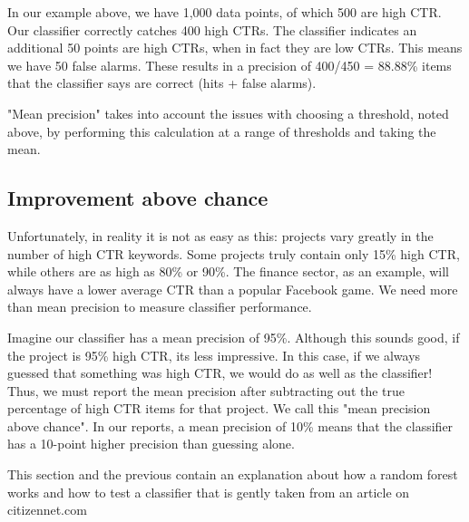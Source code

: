 
In our example above, we have 1,000 data points, of which 500 are high CTR. Our classifier correctly catches 400 high CTRs. The classifier indicates an additional 50 points are high CTRs, when in fact they are low CTRs. This means we have 50 false alarms. These results in a precision of 400/450 = 88.88\% items that the classifier says are correct (hits + false alarms).


"Mean precision" takes into account the issues with choosing a threshold, noted above, by performing this calculation at a range of thresholds and taking the mean.

\subsection*{Improvement above chance}
Unfortunately, in reality it is not as easy as this: projects vary greatly in the number of high CTR keywords. Some projects truly contain only 15\% high CTR,
 while others are as high as 80\% or 90\%. The finance sector, as an example, will always have a lower average CTR than a popular Facebook game.  We need more than mean precision to measure classifier performance.

Imagine our classifier has a mean precision of 95\%. Although this sounds good, if the project is 95\% high CTR, it\textsc{}s less impressive. In this case, if we always guessed that something was high CTR, we would do as well as the classifier! Thus, we must report the mean precision after subtracting out the true percentage of high CTR items for that project. We call this "mean precision above chance". In our reports, a mean precision of 10\% means that the classifier has a 10-point higher precision than guessing alone.



This section and the previous contain an explanation about how a random forest works and how to test a classifier that is gently taken from an article on citizennet.com\cite{rf_test}


